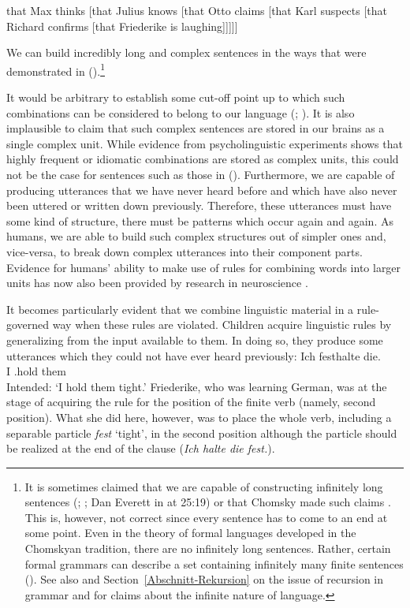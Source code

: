 \ea
\label{ex-that-max-thinks-that-recursion}
that Max thinks [that Julius knows [that Otto claims [that Karl suspects [that Richard confirms [that Friederike is laughing]]]]]
\z

\noindent
We can build incredibly long and complex sentences in the ways that were demonstrated in ().\footnote{%
 It is sometimes claimed that we are capable of constructing infinitely long sentences (\citealp*[]{NKN2001a}; \citealp[]{KS2008a-u}; Dan Everett in  at 25:19) or that Chomsky made such claims \citep[]{Leiss2003a}. This is, however, not correct since every sentence
has to come to an end at some point. Even in the theory of formal languages developed in the Chomskyan
tradition, there are no infinitely long sentences. Rather, certain formal grammars can describe a
set containing infinitely many finite sentences (\citealp[]{Chomsky57a}). See also  and
 Section~\ref{Abschnitt-Rekursion} on the issue of recursion in grammar and for claims about the
 infinite nature of language.}


It would be arbitrary to establish some cut-off point up to which such combinations can
be considered to belong to our language (\citealp[]{Harris57a}; \citealp[]{Chomsky57a}). 
It is also implausible to claim that such complex sentences are stored in our brains as a single complex
unit. While evidence from psycholinguistic experiments shows that highly frequent or
idiomatic combinations are stored as complex units, this could not be the case for sentences such as
those in (). Furthermore, we are capable of producing utterances that we have never heard
before and which have also never been uttered or written down previously. Therefore, these utterances
must have some kind of structure, there must be patterns which occur again and again. As humans, we
are able to build such complex structures out of simpler ones and, vice-versa, to break down 
complex utterances into their component parts. Evidence for humans' ability to make use of rules for combining
words into larger units has now also been provided by research in neuroscience \citep[]{Pulvermueller2010a}.

It becomes particularly evident that we combine linguistic material in a rule-governed way when
these rules are violated. Children acquire linguistic rules by generalizing from
the input available to them. In doing so, they produce some utterances which they could not
have ever heard previously: 
\ea
\settowidth{}
\gll Ich festhalte die. \\
     I \particle.hold them\\
\glt Intended: `I hold them tight.'
\z
Friederike, who was learning German, was at the stage of acquiring the rule for the position of the finite
verb (namely, second position). What she did here, however, was to place the whole verb, including a
separable particle \emph{fest} `tight', in the second position although the particle should be realized at the end of
the clause (\emph{Ich halte die fest.}).

